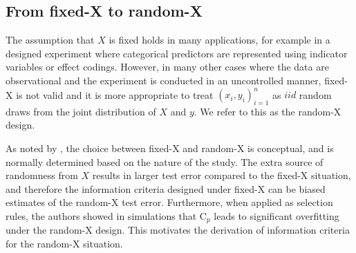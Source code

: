 \subsection{From fixed-X to random-X}
The assumption that $X$ is fixed holds in many applications, for example in a designed experiment where categorical predictors are represented using indicator variables or effect codings. However, in many other cases where the data are observational and the experiment is conducted in an uncontrolled manner, fixed-X is not valid and it is more appropriate to treat $(x_i,y_i)_{i=1}^n$ as $iid$ random draws from the joint distribution of $X$ and $y$. We refer to this as the random-X design. %

As noted by \citet{breiman1992submodel}, the choice between fixed-X and random-X is conceptual, and is normally determined based on the nature of the study. The extra source of randomness from $X$ results in larger test error compared to the fixed-X situation, and therefore the information criteria designed under fixed-X can be biased estimates of the random-X test error. Furthermore, when applied as selection rules, the authors showed in simulations that C$_p$ leads to significant overfitting under the random-X design. This motivates the derivation of information criteria for the random-X situation. 

